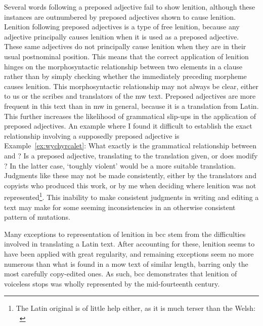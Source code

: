 Several words following a preposed adjective fail to show lenition, although these instances are outnumbered by preposed adjectives shown to cause lenition.
Lenition following preposed adjectives is a type of free lenition, because any adjective principally causes lenition when it is used as a preposed adjective.
These same adjectives do not principally cause lenition when they are in their usual postnominal position.
This means that the correct application of lenition hinges on the morphosyntactic relationship between two elements in a clause rather than by simply checking whether the immediately preceding morpheme causes lenition.
This morphosyntactic relationship may not always be clear, either to us or the scribes and translators of the \gls{mw} text.
Preposed adjectives are more frequent in this text than in \gls{mw} in general, because it is a translation from Latin.
This further increases the likelihood of grammatical slip-ups in the application of preposed adjectives.
An example where I found it difficult to establish the exact relationship involving a supposedly preposed adjective is Example~\ref{ex:wychyrcalet}:
What exactly is the grammatical relationship between  and ?
Is  a preposed adjective, translating to the translation given, or does  modify ?
In the latter case, `toughly violent' would be a more suitable translation. 
Judgments like these may not be made consistently, either by the translators and copyists who produced this work, or by me when deciding where lenition was not represented\footnote{The Latin original is of little help either, as it is much terser than the Welsh: ~\autocite[269]{griscom_historia_1929}}.
This inability to make consistent judgments in writing and editing a text may make for some seeming inconsistencies in an otherwise consistent pattern of mutations.

Many exceptions to representation of lenition in \gls{bcc} stem from the difficulties involved in translating a Latin text.
After accounting for these, lenition seems to have been applied with great regularity, and remaining exceptions seem no more numerous than what is found in a \gls{mow} text of similar length, barring only the most carefully copy-edited ones.
As such, \gls{bcc} demonstrates that lenition of voiceless stops was wholly represented by the mid-fourteenth century.

